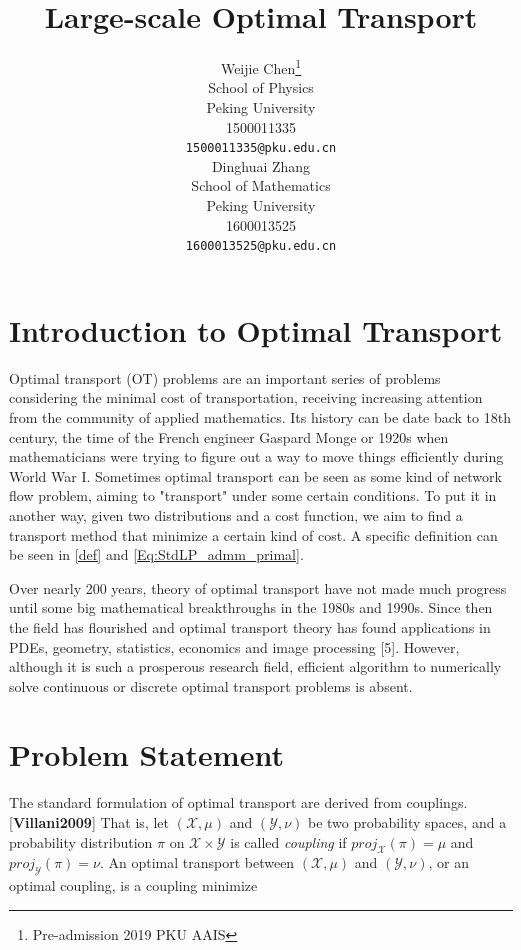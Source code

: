 \documentclass{article}
\title{Large-scale Optimal Transport}
\author{
  Weijie Chen\thanks{Pre-admission 2019 PKU AAIS} \\
  School of Physics\\
  Peking University\\
  1500011335 \\
  \texttt{1500011335@pku.edu.cn} \\
  \And
  Dinghuai Zhang \\
  School of Mathematics\\
  Peking University\\
  1600013525\\
  \texttt{1600013525@pku.edu.cn} \\
}
\begin{document}

\maketitle

\begin{abstract}
  
\end{abstract}
\begin{large}
\section{Introduction to Optimal Transport}
Optimal transport (OT) problems are an important series of problems considering the minimal cost of transportation, receiving increasing attention from the community of applied mathematics. Its history can be date back to 18th century, the time of the French engineer Gaspard Monge or 1920s when mathematicians were trying to figure out a way to move things efficiently during World War I. Sometimes optimal transport can be seen as some kind of network flow problem, aiming to "transport" under some certain conditions. To put it in another way, given two distributions and a cost function, we aim to find a transport method that minimize a certain kind of cost. A specific definition can be seen in \ref{def} and \ref{Eq:StdLP_admm_primal}.

Over nearly 200 years, theory of optimal transport have not made much progress until some big mathematical breakthroughs in the 1980s and 1990s. Since then the field has flourished and optimal transport theory has found applications in PDEs, geometry, statistics, economics and image processing [5]. However, although it is such a prosperous research field, efficient algorithm to numerically solve continuous or discrete optimal transport problems is absent. 

\section{Problem Statement}
The standard formulation of optimal transport are derived from couplings. [\textbf{Villani2009}] That is, let $ \left(\mathcal{X}, \mu \right)$ and $\left(\mathcal{Y}, \nu \right)$  be two probability spaces, and a probability distribution $\pi$ on $ \mathcal{X} \times \mathcal{Y} $ is called \emph{coupling} if $ proj_{\mathcal{X}} (\pi) = \mu $ and $ proj_{\mathcal{Y}} (\pi)= \nu $. An optimal transport between $ \left(\mathcal{X}, \mu \right)  $ and $ \left(\mathcal{Y}, \nu \right) $, or an optimal coupling, is a coupling minimize


\end{large}
\end{document}
